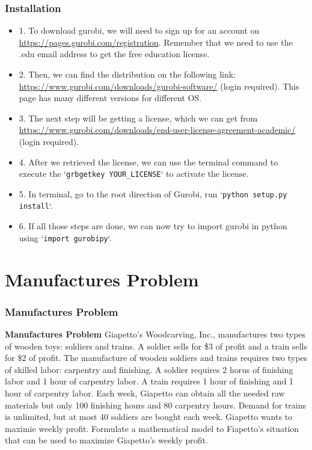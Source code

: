 \documentclass[10pt]{beamer}
\begin{document}
		\begin{frame}
			\frametitle{Installation}
			\begin{itemize}
				\item 1. To download gurobi, we will need to sign up for an account on \textcolor[rgb]{0,0,1}{\url{https://pages.gurobi.com/registration}}. Remember that we need to use the .edu email address to get the free education license.
				\item 2. Then, we can find the distribution on the following link: \textcolor[rgb]{0,0,1}{\url{https://www.gurobi.com/downloads/gurobi-software/}} (login required). This page has many different versions for different OS.
				\item 3. The next step will be getting a license, which we can get from \textcolor[rgb]{0,0,1}{\url{https://www.gurobi.com/downloads/end-user-license-agreement-academic/}} (login required).
				\item 4. After we retrieved the license, we can use the terminal command to execute the \textcolor[rgb]{0.7,0.7,0}{`\texttt{grbgetkey YOUR\_LICENSE}`} to activate the license.
				\item 5. In terminal, go to the root direction of Gurobi, run \textcolor[rgb]{0.7,0.7,0}{`\texttt{python setup.py install}`}.
				\item 6. If all those steps are done, we can now try to import gurobi in python using \textcolor[rgb]{0.7,0.7,0}{`\texttt{import gurobipy}`}.
			\end{itemize}
		\end{frame}

	\section{Manufactures Problem}
		\begin{frame}
			\frametitle{Manufactures Problem}
				\textbf{Manufactures Problem} Giapetto’s Woodcarving, Inc., manufactures two types of wooden toys: soldiers and trains. A soldier sells for \$3 of profit and a train sells for \$2 of profit. The manufacture of wooden soldiers and trains requires two types of skilled labor: carpentry and finishing. A soldier requires 2 horus of finishing labor and 1 hour of carpentry labor. A train requires 1 hour of finishing and 1 hour of carpentry labor. Each week, Giapetto can obtain all the needed raw materials but only 100 finishing hours and 80 carpentry hours. Demand for trains is unlimited, but at most 40 soldiers are bought each week. Giapetto wants to maximie weekly profit. Formulate a mathematical model to Fiapetto’s situation that can be used to maximize Giapetto’s weekly profit.
		\end{frame}
\end{document}
